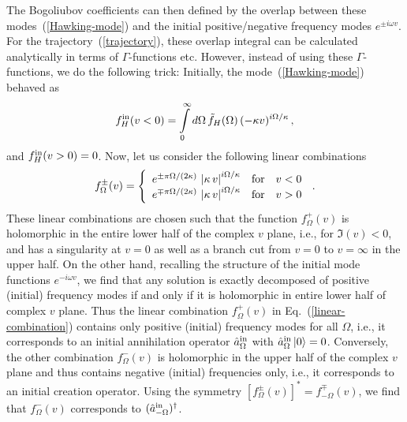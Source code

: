 \documentclass[aps,prd,showpacs,amssymb,nofootinbib,twocolumn]{revtex4}
\newcommand{\ket}[1]{\left|#1\right>}
\newcommand{\bea}{\begin{eqnarray}}
\newcommand{\ea}{\end{eqnarray}}
\begin{document}
The Bogoliubov coefficients can then defined by the overlap between these 
modes~(\ref{Hawking-mode}) and the initial positive/negative frequency modes  
$e^{\pm i\omega v}$. 
%
For the trajectory~(\ref{trajectory}),  these overlap integral can be 
calculated analytically in terms of $\Gamma$-functions etc. 
%
However, instead of using these $\Gamma$-functions, we do the following trick:
%
Initially, the mode~(\ref{Hawking-mode}) behaved as 
%
\bea
\label{Hawking-initial}
f_H^{\rm in}(v<0)=\int\limits_0^\infty d\Omega\,\tilde f_H(\Omega)\, 
(-\kappa v)^{i\Omega/\kappa} 
\,,
\ea
%
and $f_H^{\rm in}(v>0)=0$.
%
Now, let us consider the following linear combinations 
%
\bea
\label{linear-combination}
f^\pm_\Omega(v)
=
\left\{
\begin{array}{lll}
e^{\pm\pi\Omega/(2\kappa)}\,\left|\kappa\,v\right|^{i\Omega/\kappa} 
& {\rm for} & v<0 \\
e^{\mp\pi\Omega/(2\kappa)}\,\left|\kappa\,v\right|^{i\Omega/\kappa} 
& {\rm for} & v>0
\end{array}
\right.
\,.
\ea
%
These linear combinations are chosen such that the function $f^+_\Omega(v)$ 
is holomorphic in the entire lower half of the complex $v$ plane, i.e., 
for $\Im(v)<0$, and has a singularity at $v=0$ as well as a branch cut 
from $v=0$ to $v=\infty$ in the upper half.
%
On the other hand, recalling the structure of the initial mode functions 
$e^{-i\omega v}$, we find that any solution is exactly
decomposed of positive (initial) frequency modes if and only if it is 
holomorphic in entire lower half of complex $v$ plane.
%
Thus the linear combination $f^+_\Omega(v)$ in Eq.~(\ref{linear-combination}) 
contains only positive (initial) frequency modes for all $\Omega$, 
i.e., it corresponds to an initial annihilation operator 
$\hat a_\Omega^{\rm in}$ with $\hat a_\Omega^{\rm in}\ket{0}=0$. 
%
Conversely, the other combination  $f^-_\Omega(v)$ is holomorphic 
in the upper half of the complex $v$ plane and thus contains negative (initial)
frequencies only, i.e., it corresponds to an initial creation operator.
%
Using the symmetry $[f^\pm_\Omega(v)]^*=f^\mp_{-\Omega}(v)$,
we find that $f^-_\Omega(v)$ corresponds to 
$(\hat a^{\rm in}_{-\Omega})^\dagger$. 
\end{document}
